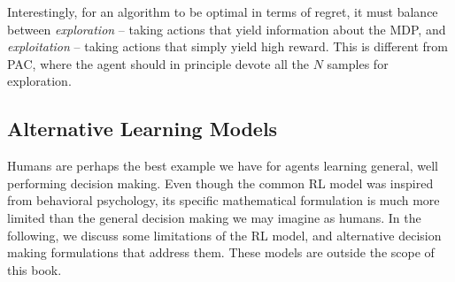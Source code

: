 Interestingly, for an algorithm to be optimal in terms of regret, it must balance between \textit{exploration} -- taking actions that yield information about the MDP, and \textit{exploitation} -- taking actions that simply yield high reward. This is different from PAC, where the agent should in principle devote all the $N$ samples for exploration. 



\subsection{Alternative Learning Models}

Humans are perhaps the best example we have for agents learning general, well performing decision making. Even though the common RL model was inspired from behavioral psychology, its specific mathematical formulation is much more limited than the general decision making we may imagine as humans. In the following, we discuss some limitations of the RL model, and alternative decision making formulations that address them. These models are outside the scope of this book.

